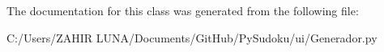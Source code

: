 The documentation for this class was generated from the following file\-:\begin{DoxyCompactItemize}
\item 
C\-:/\-Users/\-Z\-A\-H\-I\-R  L\-U\-N\-A/\-Documents/\-Git\-Hub/\-Py\-Sudoku/ui/Generador.\-py\end{DoxyCompactItemize}
